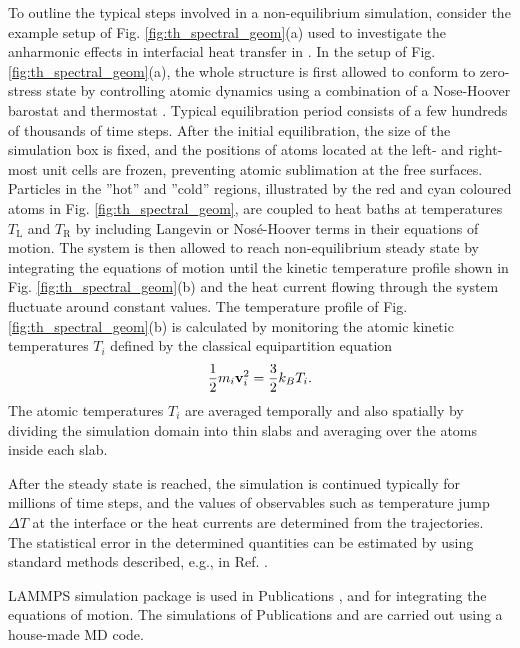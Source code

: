 To outline the typical steps involved in a non-equilibrium simulation, consider the example setup of Fig. \ref{fig:th_spectral_geom}(a) used to investigate the anharmonic effects in interfacial heat transfer in . In the setup of Fig. \ref{fig:th_spectral_geom}(a), the whole structure is first allowed to conform to zero-stress state by controlling atomic dynamics using a combination of a Nose-Hoover barostat and thermostat \cite{allentildesley}. Typical equilibration period consists of a few hundreds of thousands of time steps. After the initial equilibration, the size of the simulation box is fixed, and the positions of atoms located at the left- and right-most unit cells are frozen, preventing atomic sublimation at the free surfaces. Particles in the ''hot'' and ''cold'' regions, illustrated by the red and cyan coloured atoms in Fig. \ref{fig:th_spectral_geom}, are coupled to heat baths at temperatures $T_{\textrm{L}}$ and $T_{\textrm{R}}$ by including Langevin or Nos\'e-Hoover terms in their equations of motion. The system is then allowed to reach non-equilibrium steady state by integrating the equations of motion until the kinetic temperature profile shown in Fig. \ref{fig:th_spectral_geom}(b) and the heat current flowing through the system fluctuate around constant values. The temperature profile of Fig. \ref{fig:th_spectral_geom}(b) is calculated by monitoring the atomic kinetic temperatures $T_i$ defined by the classical equipartition equation \cite{allentildesley}
\begin{equation}
 \frac{1}{2} m_i \mathbf{v}_i^2 = \frac{3}{2} k_B T_i.
\end{equation}
The atomic temperatures $T_i$ are averaged temporally and also spatially by dividing the simulation domain into thin slabs and averaging over the atoms inside each slab. 

After the steady state is reached, the simulation is continued typically for millions of time steps, and the values of observables such as temperature jump $\Delta T$ at the interface or the heat currents are determined from the trajectories. The statistical error in the determined quantities can be estimated by using standard methods described, e.g., in Ref. \cite{allentildesley}.

LAMMPS simulation package \cite{plimpton95} is used in Publications ,  and  for integrating the equations of motion. The simulations of Publications  and  are carried out using a house-made MD code. 

